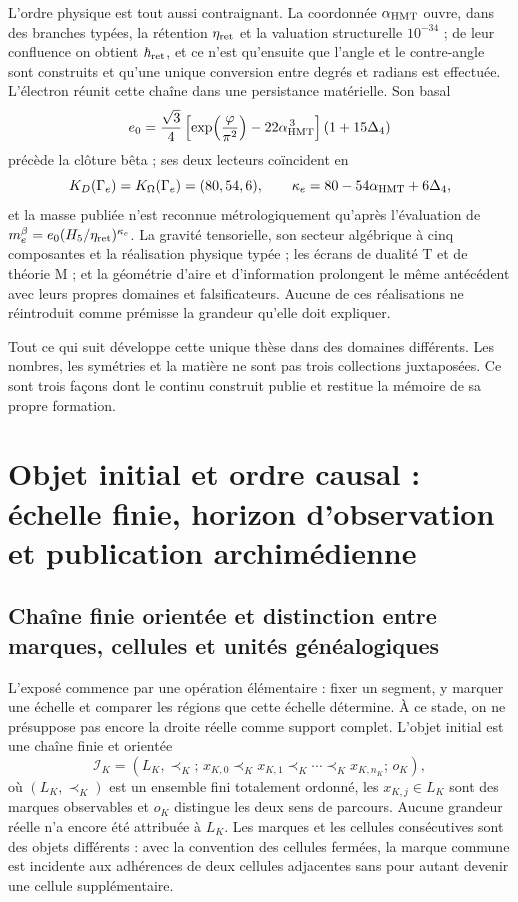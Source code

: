 L'ordre physique est tout aussi contraignant. La coordonnée
\(\alpha_{\rm HMT}\) ouvre, dans des branches typées, la rétention
\(\eta_{\rm ret}\) et la valuation structurelle \(10^{-34}\) ; de leur confluence
on obtient \(\hbar_{\rm ret}\), et ce n'est qu'ensuite que l'angle et le
contre-angle sont construits et qu'une unique conversion entre degrés et radians est effectuée.
L'électron réunit cette chaîne dans une persistance matérielle. Son basal
\[
e_0=
\frac{\sqrt3}{4}
\left[
\exp\!\left(\frac{\varphi}{\pi^2}\right)
-22\alpha_{\rm HMT}^{\,3}
\right](1+15\Delta_4)
\]
précède la clôture bêta ; ses deux lecteurs coïncident en
\[
K_D(\Gamma_e)=K_\Omega(\Gamma_e)=(80,54,6),
\qquad
\kappa_e=80-54\alpha_{\rm HMT}+6\Delta_4,
\]
et la masse publiée n'est reconnue métrologiquement qu'après l'évaluation de
\(m_e^\beta=e_0(H_5/\eta_{\rm ret})^{\kappa_e}\). La gravité tensorielle, son
secteur algébrique à cinq composantes et la réalisation physique typée ; les
écrans de dualité T et de théorie M ; et la géométrie d'aire et d'information
prolongent le même antécédent avec leurs propres domaines et falsificateurs. Aucune
de ces réalisations ne réintroduit comme prémisse la grandeur qu'elle doit
expliquer.

Tout ce qui suit développe cette unique thèse dans des domaines différents. Les
nombres, les symétries et la matière ne sont pas trois collections juxtaposées. Ce sont
trois façons dont le continu construit publie et restitue la mémoire de
sa propre formation.

\section{Objet initial et ordre causal : échelle finie, horizon d'observation et publication archimédienne}

\subsection*{Chaîne finie orientée et distinction entre marques, cellules et unités généalogiques}

L'exposé commence par une opération élémentaire : fixer un segment,
y marquer une échelle et comparer les régions que cette échelle détermine. À
ce stade, on ne présuppose pas encore la droite réelle comme support complet.
L'objet initial est une chaîne finie et orientée
\[
 \mathcal I_K=(L_K,\prec_K;\,
 x_{K,0}\prec_K x_{K,1}\prec_K\cdots\prec_K x_{K,n_K};\,o_K),
\]
où \((L_K,\prec_K)\) est un ensemble fini totalement ordonné, les
\(x_{K,j}\in L_K\) sont des marques observables et \(o_K\) distingue les deux
sens de parcours. Aucune grandeur réelle n'a encore été attribuée à \(L_K\).
Les marques et les cellules consécutives sont des objets différents : avec la
convention des cellules fermées, la marque commune est incidente aux adhérences
de deux cellules adjacentes sans pour autant devenir une cellule supplémentaire.

